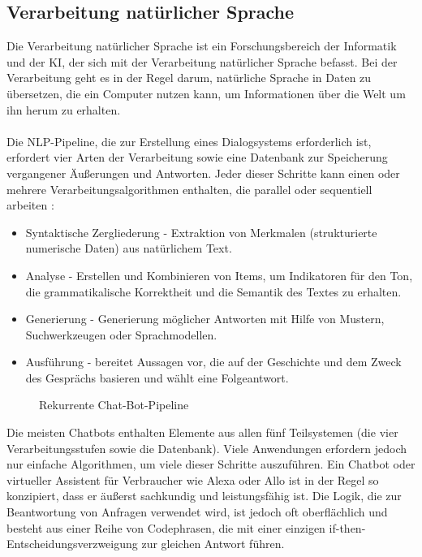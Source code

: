 \subsection{Verarbeitung natürlicher Sprache}
Die Verarbeitung natürlicher Sprache ist ein Forschungsbereich der Informatik und der \ac{KI}, der sich mit der Verarbeitung natürlicher Sprache befasst. 
Bei der Verarbeitung geht es in der Regel darum, natürliche Sprache in Daten zu übersetzen, die ein Computer nutzen kann, um Informationen über die Welt um ihn herum zu erhalten.\\\\
Die \ac{NLP}-Pipeline, die zur Erstellung eines Dialogsystems erforderlich ist, erfordert vier Arten der Verarbeitung sowie eine Datenbank zur Speicherung vergangener Äußerungen und Antworten. 
Jeder dieser Schritte kann einen oder mehrere Verarbeitungsalgorithmen enthalten, die parallel oder sequentiell arbeiten \cite{lane_natural_2019}:
\begin{itemize}
    \item Syntaktische Zergliederung - Extraktion von Merkmalen (strukturierte numerische Daten) aus natürlichem Text.
    \item Analyse - Erstellen und Kombinieren von Items, um Indikatoren für den Ton, die grammatikalische Korrektheit und die Semantik des Textes zu erhalten.
    \item Generierung - Generierung möglicher Antworten mit Hilfe von Mustern, Suchwerkzeugen oder Sprachmodellen.
    \item Ausführung - bereitet Aussagen vor, die auf der Geschichte und dem Zweck des Gesprächs basieren und wählt eine Folgeantwort.
\end{itemize}
\begin{figure}[H]
    \centering
    \caption{Rekurrente Chat-Bot-Pipeline}
    \label{figure:Chat-Bot-Pipeline}
\end{figure}
\noindent
Die meisten Chatbots enthalten Elemente aus allen fünf Teilsystemen (die vier Verarbeitungsstufen sowie die Datenbank). 
Viele Anwendungen erfordern jedoch nur einfache Algorithmen, um viele dieser Schritte auszuführen. 
Ein Chatbot oder virtueller Assistent für Verbraucher wie Alexa oder Allo ist in der Regel so konzipiert, dass er äußerst sachkundig und leistungsfähig ist. 
Die Logik, die zur Beantwortung von Anfragen verwendet wird, ist jedoch oft oberflächlich und besteht aus einer Reihe von Codephrasen, die mit einer einzigen if-then-Entscheidungsverzweigung zur gleichen Antwort führen. 
